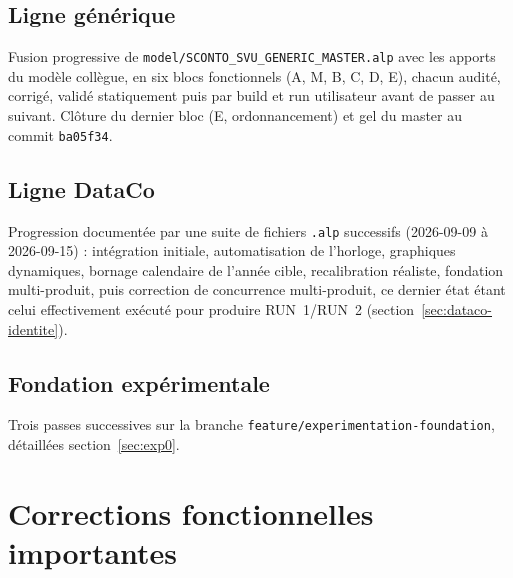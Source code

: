\documentclass[11pt,a4paper]{article}
\newcommand{\code}[1]{\texttt{#1}}
\begin{document}
\subsection{Ligne générique}

Fusion progressive de \code{model/SCONTO\_SVU\_GENERIC\_MASTER.alp} avec
les apports du modèle collègue, en six blocs fonctionnels (A, M, B, C, D,
E), chacun audité, corrigé, validé statiquement puis par build et run
utilisateur avant de passer au suivant. Clôture du dernier bloc (E,
ordonnancement) et gel du master au commit \code{ba05f34}.

\subsection{Ligne DataCo}

Progression documentée par une suite de fichiers \code{.alp} successifs
(2026-09-09 à 2026-09-15) : intégration initiale, automatisation de
l'horloge, graphiques dynamiques, bornage calendaire de l'année cible,
recalibration réaliste, fondation multi-produit, puis correction de
concurrence multi-produit, ce dernier état étant celui effectivement
exécuté pour produire RUN~1/RUN~2 (section~\ref{sec:dataco-identite}).

\subsection{Fondation expérimentale}

Trois passes successives sur la branche \code{feature/experimentation-foundation},
détaillées section~\ref{sec:exp0}.

\section{Corrections fonctionnelles importantes}
\label{sec:corrections}
\end{document}
